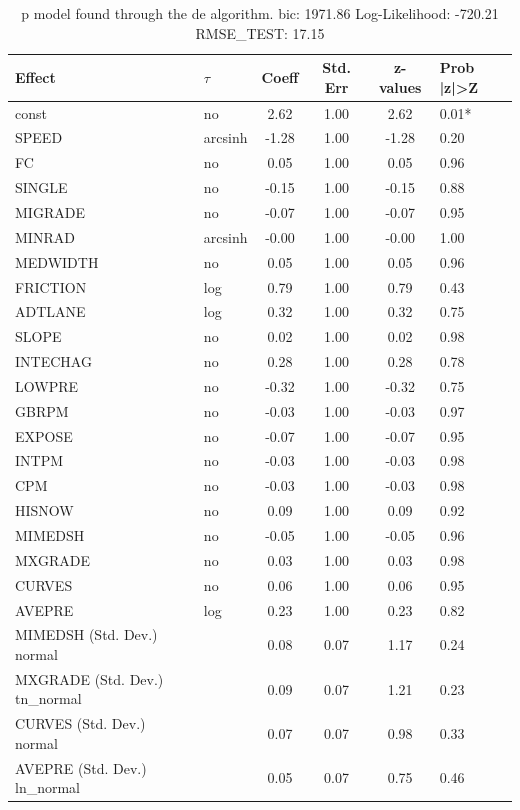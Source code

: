\begin{table}
	\caption{p model found through the de algorithm. bic: 1971.86 Log-Likelihood: -720.21 RMSE_TEST: 17.15}
	\begin{center}
		\begin{tabular}{|l|l|c|c|c|l|}
			\hline
			Effect & $\tau$ & Coeff & Std. Err & z-values & Prob |z|>Z \\
			\hline
			const & no & 2.62 & 1.00 & 2.62 & 0.01* \\
			\hline
			SPEED & arcsinh & -1.28 & 1.00 & -1.28 & 0.20 \\
			\hline
			FC & no & 0.05 & 1.00 & 0.05 & 0.96 \\
			\hline
			SINGLE & no & -0.15 & 1.00 & -0.15 & 0.88 \\
			\hline
			MIGRADE & no & -0.07 & 1.00 & -0.07 & 0.95 \\
			\hline
			MINRAD & arcsinh & -0.00 & 1.00 & -0.00 & 1.00 \\
			\hline
			MEDWIDTH & no & 0.05 & 1.00 & 0.05 & 0.96 \\
			\hline
			FRICTION & log & 0.79 & 1.00 & 0.79 & 0.43 \\
			\hline
			ADTLANE & log & 0.32 & 1.00 & 0.32 & 0.75 \\
			\hline
			SLOPE & no & 0.02 & 1.00 & 0.02 & 0.98 \\
			\hline
			INTECHAG & no & 0.28 & 1.00 & 0.28 & 0.78 \\
			\hline
			LOWPRE & no & -0.32 & 1.00 & -0.32 & 0.75 \\
			\hline
			GBRPM & no & -0.03 & 1.00 & -0.03 & 0.97 \\
			\hline
			EXPOSE & no & -0.07 & 1.00 & -0.07 & 0.95 \\
			\hline
			INTPM & no & -0.03 & 1.00 & -0.03 & 0.98 \\
			\hline
			CPM & no & -0.03 & 1.00 & -0.03 & 0.98 \\
			\hline
			HISNOW & no & 0.09 & 1.00 & 0.09 & 0.92 \\
			\hline
			MIMEDSH & no & -0.05 & 1.00 & -0.05 & 0.96 \\
			\hline
			MXGRADE & no & 0.03 & 1.00 & 0.03 & 0.98 \\
			\hline
			CURVES & no & 0.06 & 1.00 & 0.06 & 0.95 \\
			\hline
			AVEPRE & log & 0.23 & 1.00 & 0.23 & 0.82 \\
			\hline
			MIMEDSH (Std. Dev.) normal &  & 0.08 & 0.07 & 1.17 & 0.24 \\
			\hline
			MXGRADE (Std. Dev.) tn_normal &  & 0.09 & 0.07 & 1.21 & 0.23 \\
			\hline
			CURVES (Std. Dev.) normal &  & 0.07 & 0.07 & 0.98 & 0.33 \\
			\hline
			AVEPRE (Std. Dev.) ln_normal &  & 0.05 & 0.07 & 0.75 & 0.46 \\
			\hline
		\end{tabular}
	\end{center}
\end{table}